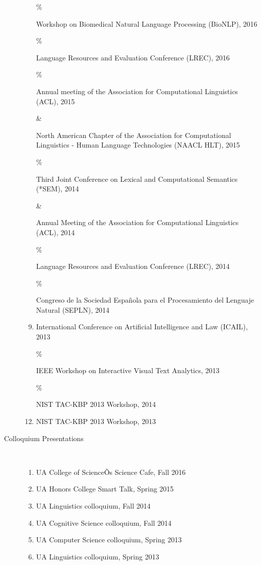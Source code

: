 \documentclass[10pt]{article}
\begin{document}
\begin{description}
\begin{enumerate}
\item 
[\% \addtocounter{enumi}{1}\theenumi ]
Workshop on Biomedical Natural Language Processing (BioNLP), 2016

\item 
[\% \addtocounter{enumi}{1}\theenumi ]
Language Resources and Evaluation Conference (LREC), 2016

\item 
[\% \addtocounter{enumi}{1}\theenumi ]
Annual meeting of the Association for Computational Linguistics (ACL), 2015

\item 
[\& \addtocounter{enumi}{1}\theenumi ]
North American Chapter of the Association for Computational Linguistics - Human Language Technologies (NAACL HLT), 2015

\item 
[\% \addtocounter{enumi}{1}\theenumi ]
Third Joint Conference on Lexical and Computational Semantics (*SEM), 2014

\item 
[\& \addtocounter{enumi}{1}\theenumi ]
Annual Meeting of the Association for Computational Linguistics (ACL), 2014

\item 
[\% \addtocounter{enumi}{1}\theenumi ]
Language Resources and Evaluation Conference (LREC), 2014

\item 
[\% \addtocounter{enumi}{1}\theenumi ]
Congreso de la Sociedad Espa\~{n}ola para el Procesamiento del Lenguaje Natural (SEPLN), 2014

\item 
International Conference on Artificial Intelligence and Law (ICAIL), 2013

\item 
[\% \addtocounter{enumi}{1}\theenumi ]
IEEE Workshop on Interactive Visual Text Analytics, 2013

\item 
[\% \addtocounter{enumi}{1}\theenumi ]
NIST TAC-KBP 2013 Workshop, 2014

\item 
NIST TAC-KBP 2013 Workshop, 2013


\end{enumerate}


\item [Colloquium Presentations]\

\begin{enumerate}
\item UA College of ScienceÕs Science Cafe, Fall 2016
\item UA Honors College Smart Talk, Spring 2015
\item UA Linguistics colloquium, Fall 2014
\item UA Cognitive Science colloquium, Fall 2014
\item UA Computer Science colloquium, Spring 2013
\item UA Linguistics colloquium, Spring 2013
\end{enumerate}


\end{description}
\end{document}
